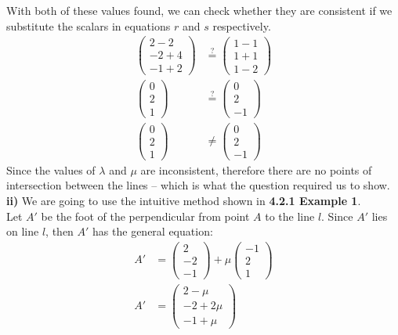 \documentclass[hidelinks, a4paper, 12pt]{article}
\newcommand{\bd}{\textbf}
\newcommand{\n}{\\[\baselineskip]}
\begin{document}
            With both of these values found, we can check whether they are consistent if we substitute the scalars in equations $r$ and $s$ respectively.
            \[\begin{split}
                \begin{pmatrix} 2 - 2 \\ -2 + 4 \\ -1 + 2\end{pmatrix} &\overset{?}{=} \begin{pmatrix} 1 - 1 \\ 1  + 1\\ 1 - 2 \end{pmatrix}\\
                \begin{pmatrix} 0 \\ 2 \\ 1\end{pmatrix} &\overset{?}{=} \begin{pmatrix} 0 \\ 2\\ -1 \end{pmatrix}\\
                \begin{pmatrix} 0 \\ 2 \\ 1\end{pmatrix} &\neq \begin{pmatrix} 0 \\ 2\\ -1 \end{pmatrix}
            \end{split}\]
            Since the values of $\lambda$ and $\mu$ are inconsistent, therefore there are no points of intersection between the lines -- which is what
            the question required us to show.\n
            \bd{ii) }We are going to use the intuitive method shown in \bd{4.2.1 Example 1}.\n
            Let $A'$ be the foot of the perpendicular from point $A$ to the line $l$. Since $A'$ lies on line $l$, then $A'$ has the general equation:
            \[\begin{split}
                A' &= \begin{pmatrix} 2 \\ -2 \\ -1 \end{pmatrix} + \mu \begin{pmatrix} -1 \\ 2 \\ 1 \end{pmatrix}\\
                A' &= \begin{pmatrix} 2-\mu \\ -2+2\mu \\ -1+\mu \end{pmatrix}
            \end{split}\]
\end{document}

